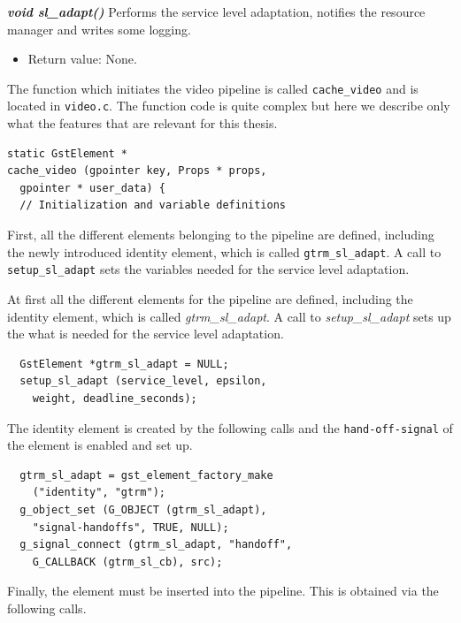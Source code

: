 \documentclass[nobiblatex]{LTHthesis}
\begin{document}
\begin{framed}
	\begin{flushleft}	
		\emph{\textbf{{void sl\_adapt()}}}
		Performs the service level adaptation, notifies the resource manager 
	and writes some logging.
		\begin{itemize}
		\item Return value: None.
		\end{itemize}
		\end{flushleft}
\end{framed}

The function which initiates the video pipeline is called 
\texttt{cache\_video} and is located in \texttt{video.c}. The function code
is quite complex but here we describe only what the features that are
relevant for this thesis.

\begin{lstlisting}
static GstElement *
cache_video (gpointer key, Props * props, 
  gpointer * user_data) {
  // Initialization and variable definitions
\end{lstlisting}

First, all the different elements belonging to the pipeline are defined,
including the newly introduced identity element, which is called 
\texttt{gtrm\_sl\_adapt}. A call to \texttt{setup\_sl\_adapt} sets
the variables needed for the service level adaptation.

At first all the different elements for the pipeline are defined, including the identity element, which is called \emph{gtrm\_sl\_adapt}. A call to \emph{setup\_sl\_adapt} sets up the what is needed for the service level adaptation.
\begin{lstlisting}
  GstElement *gtrm_sl_adapt = NULL;
  setup_sl_adapt (service_level, epsilon, 
	weight, deadline_seconds);
\end{lstlisting}

The identity element is created by the following calls and the 
\texttt{hand-off-signal} of the element is enabled and set up.

\begin{lstlisting}
  gtrm_sl_adapt = gst_element_factory_make 
	("identity", "gtrm");
  g_object_set (G_OBJECT (gtrm_sl_adapt), 
	"signal-handoffs", TRUE, NULL);
  g_signal_connect (gtrm_sl_adapt, "handoff", 
	G_CALLBACK (gtrm_sl_cb), src);
\end{lstlisting}

Finally, the element must be inserted into the pipeline. This is obtained
via the following calls.
\end{document}
